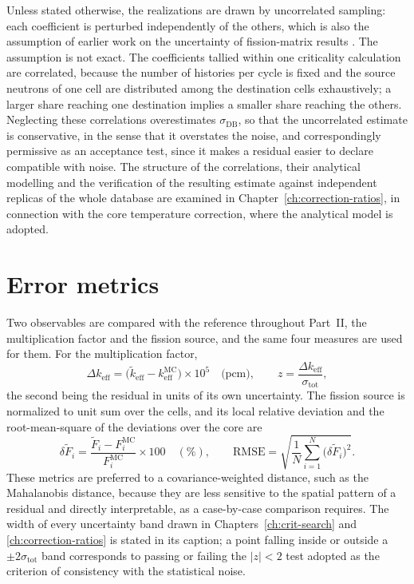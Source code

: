 Unless stated otherwise, the realizations are drawn by uncorrelated sampling: each
coefficient is perturbed independently of the others, which is also the
assumption of earlier work on the uncertainty of fission-matrix results
\cite{HeWaltersNSE2022}. The assumption is not exact. The coefficients tallied
within one criticality calculation are correlated, because the number of
histories per cycle is fixed and the source neutrons of one cell are
distributed among the destination cells exhaustively; a larger share reaching
one destination implies a smaller share reaching the others. Neglecting these
correlations overestimates $\sigma_{\mathrm{DB}}$, so that the uncorrelated
estimate is conservative, in the sense that it overstates the noise, and
correspondingly permissive as an acceptance test, since it makes a residual
easier to declare compatible with noise. The structure of the correlations,
their analytical modelling and the verification of the resulting estimate against
independent replicas of the whole database are examined in
Chapter~\ref{ch:correction-ratios}, in connection with the core temperature
correction, where the analytical model is adopted.

\section{Error metrics}\label{fm:sec:metrics}

Two observables are compared with the reference throughout Part~II, the
multiplication factor and the fission source, and the same four measures are
used for them. For the multiplication factor,
%
\begin{equation}
  \Delta k_{\mathrm{eff}} = \big(\tilde k_{\mathrm{eff}} - k^{\mathrm{MC}}_{\mathrm{eff}}\big)\times10^{5}
  \quad\text{(pcm)},
  \qquad
  z = \frac{\Delta k_{\mathrm{eff}}}{\sigma_{\mathrm{tot}}},
  \label{fm:eq:dk}
\end{equation}
%
the second being the residual in units of its own uncertainty. The fission
source is normalized to unit sum over the cells, and its local relative
deviation and the root-mean-square of the deviations over the core are
%
\begin{equation}
  \delta\tilde F_i = \frac{\tilde F_i - F_i^{\mathrm{MC}}}{F_i^{\mathrm{MC}}}\times100
  \quad(\%),
  \qquad
  \mathrm{RMSE} = \sqrt{\frac{1}{N}\sum_{i=1}^{N}\big(\delta\tilde F_i\big)^2}.
  \label{fm:eq:source}
\end{equation}
%
These metrics are preferred to a covariance-weighted distance, such as the
Mahalanobis distance, because they are less sensitive to the spatial pattern of
a residual and directly interpretable, as a case-by-case comparison requires.
The width of every uncertainty band drawn in Chapters~\ref{ch:crit-search}
and \ref{ch:correction-ratios} is stated in its caption; a point falling
inside or outside a $\pm2\sigma_{\mathrm{tot}}$ band corresponds to passing or
failing the $|z|<2$ test adopted as the criterion of consistency with the
statistical noise.
